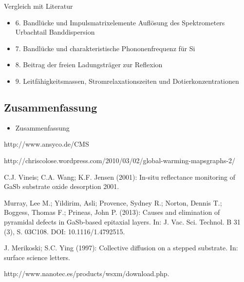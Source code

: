 \documentclass[paper=a4,fontsize=10pt,DIV=18,twocolumn,parskip=half]{scrartcl}
\numberwithin{equation}{section}    %
\begin{document}
Vergleich mit Literatur


\begin{itemize}
\item 6. Bandlücke und Impulsmatrixelemente
Auflösung des Spektrometers
Urbachtail 
Banddispersion
\item 7. Bandlücke und charakteristische Phononenfrequenz für Si
\item 8. Beitrag der freien Ladungsträger zur Reflexion
\item 9. Leitfähigkeitsmassen, Stromrelaxationszeiten und Dotierkonzentrationen
\end{itemize}

\subsection{Zusammenfassung}
\begin{itemize}
\item Zusammenfassung
\end{itemize}

\begin{thebibliography}{}   

 http://www.ansyco.de/CMS

http://chriscolose.wordpress.com/2010/03/02/global-warming-mapsgraphs-2/

 C.J. Vineis; C.A. Wang; K.F. Jensen (2001): In-situ reflectance 
monitoring of GaSb substrate oxide desorption 2001.

 Murray, Lee M.; Yildirim, Asli; Provence, Sydney R.; Norton, 
Dennis T.; Boggess, Thomas F.; Prineas, John P. (2013): Causes and elimination 
of pyramidal defects in GaSb-based epitaxial layers. In: J. Vac. Sci. Technol. B 
31 (3), S. 03C108. DOI: 10.1116/1.4792515.
  
 J. Merikoski; S.C. Ying (1997): Collective diffusion on a 
stepped substrate. In: surface science letters.

 http://www.nanotec.es/products/wsxm/download.php. 
\end{thebibliography}
\end{document}
